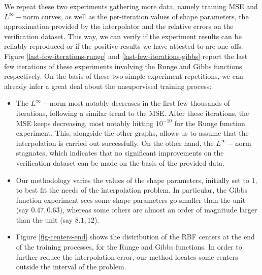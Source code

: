 \documentclass[12pt]{report} %
\begin{document}
We repeat these two experiments gathering more data, namely training MSE and
$L^{\infty} -$norm curves, as well as the per-iteration values of shape parameters,
the approximation provided by the interpolator and the relative errors on the verification dataset. This way, we can verify if the
experiment results can be reliably reproduced or if the positive results we have attested to are one-offs.
Figure \ref{last-few-iterations-runge} and \ref{last-few-iterations-gibbs}
report the last few iterations of these experiments involving the Runge and
Gibbs functions respectively. On the basis of these two simple experiment
repetitions, we can already infer a great deal about the unsupervised training
process:
\begin{itemize}
  \item The $L^{\infty} -$norm most notably decreases in the first few
  thousands of iterations, following a similar trend to the MSE. After these
  iterations, the MSE keeps decreasing, most notably hitting $10^{-
  10}$ for the Runge function experiment. This, alongside the other graphs,
  allows us to assume that the interpolation is carried out
  successfully. On the other hand, the $L^{\infty} -$norm stagnates, which
  indicates that no significant improvements on the verification dataset can be made on the basis of the
  provided data. 
  
  \item Our methodology varies the values of the shape parameters, initially
  set to $1$, to best fit the needs of the interpolation problem. In
  particular, the Gibbs function experiment sees some shape parameters go
  smaller than the unit (say $0.47, 0.63$), whereas some others are almost an
  order of magnitude larger than the unit (say $8.1, 12$).
  
  \item Figure \ref{fig-centers-end} shows the distribution of the RBF centers
  at the end of the training processes, for the Runge and Gibbs functions. In
  order to further reduce the interpolation error, our method locates some centers outside the interval of the problem.


\end{itemize}
\end{document}
